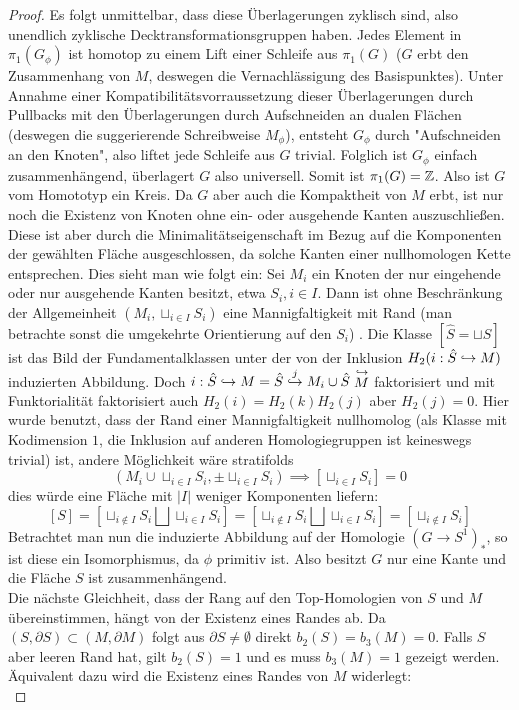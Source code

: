 \begin{proof}
	 Es folgt unmittelbar, dass diese Überlagerungen zyklisch sind, also unendlich zyklische Decktransformationsgruppen haben. Jedes Element in $\pi_1(G_\phi)$ ist homotop zu einem Lift einer Schleife  aus $\pi_1(G)$ ($G$ erbt den Zusammenhang von $M$, deswegen die Vernachlässigung des Basispunktes). Unter Annahme einer Kompatibilitätsvorraussetzung dieser Überlagerungen durch Pullbacks mit den Überlagerungen durch Aufschneiden an dualen Flächen (deswegen die suggerierende Schreibweise $M_\phi$), entsteht $G_\phi$ durch "Aufschneiden an den Knoten", also liftet jede Schleife aus $G$ trivial. Folglich ist $G_\phi$ einfach zusammenhängend, überlagert $G$ also universell. Somit ist $\pi_1(G)= \mathbb{Z}$. Also ist $G$ vom Homototyp ein Kreis. Da $G$ aber auch die Kompaktheit von $M$ erbt, ist nur noch die Existenz von Knoten ohne ein- oder ausgehende Kanten auszuschließen. Diese ist aber durch die Minimalitätseigenschaft im Bezug auf die Komponenten der gewählten Fläche ausgeschlossen, da solche Kanten einer nullhomologen Kette entsprechen. Dies sieht man wie folgt ein: Sei $M_i$ ein Knoten der nur eingehende oder nur ausgehende Kanten besitzt, etwa $S_i, i \in I$. Dann ist ohne Beschränkung der Allgemeinheit $(M_i,\sqcup_{i\in I}S_i)$ eine Mannigfaltigkeit mit Rand (man betrachte sonst die umgekehrte Orientierung auf den $S_i$) . Die Klasse $[\hat S = \sqcup S]$ ist das Bild der Fundamentalklassen unter der von der Inklusion $H_2(i:\hat S \hookrightarrow M)$ induzierten Abbildung. Doch $i: \hat S \hookrightarrow M = \hat S \stackrel j {\hookrightarrow} M_i \cup \hat S \stackrel{\hookrightarrow} M$ faktorisiert und mit Funktorialität faktorisiert auch $H_2(i)=H_2(k)H_2(j)$ aber $H_2(j)=0$. Hier wurde benutzt, dass der Rand einer Mannigfaltigkeit nullhomolog (als Klasse mit Kodimension $1$, die Inklusion auf anderen Homologiegruppen ist keineswegs trivial) ist,
	 andere Möglichkeit wäre stratifolds
	 \[
	 	(M_i\cup \sqcup_{i\in I} S_i, \pm \sqcup_{i\in I} S_i) \implies [\sqcup_{i\in I}S_i]=0
	 \]
	 dies würde eine Fläche mit $|I|$ weniger Komponenten liefern:
	 \[
	 	[S]=[\sqcup_{i\not \in I} S_i\bigsqcup \sqcup_{i\in I} S_i] = [\sqcup_{i\not \in I} S_i \bigsqcup \sqcup_{i\in I} S_i] = [\sqcup_{i\not \in I}S_i]
	 \]
	 Betrachtet man nun die induzierte Abbildung auf der Homologie $(G\to S^1)_*$, so ist diese ein Isomorphismus, da $\phi$ primitiv ist. Also besitzt $G$ nur eine Kante und die Fläche $S$ ist zusammenhängend.\\
	 Die nächste Gleichheit, dass der Rang auf den Top-Homologien von $S$ und $M$ übereinstimmen, hängt von der Existenz eines Randes ab. Da $(S,\partial S) \subset (M,\partial M)$ folgt aus $\partial S \neq \emptyset$ direkt $b_2(S)=b_3(M)=0$. Falls $S$ aber leeren Rand hat, gilt $b_2(S)=1$ und es muss $b_3(M)=1$ gezeigt werden. Äquivalent dazu wird die Existenz eines Randes von $M$ widerlegt:\\

\end{proof}
